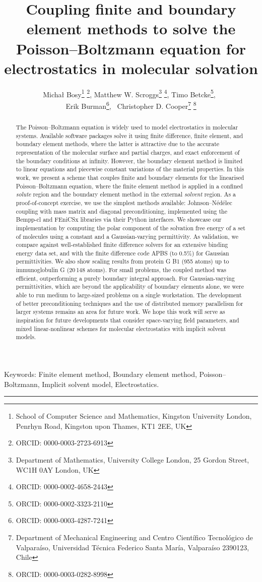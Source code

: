 \documentclass[12pt]{article}
\title{Coupling finite and boundary element methods to solve the Poisson--Boltzmann equation for electrostatics in molecular solvation}
\author{Micha\l{} Bosy\thanks{School of Computer Science and Mathematics, Kingston University London, Penrhyn Road, Kingston upon Thames, KT1 2EE, UK} \thanks{ORCID: 0000-0003-2723-6913}, 
    Matthew W. Scroggs\thanks{Department of Mathematics, University College London, 25 Gordon Street, WC1H 0AY London, UK} \thanks{ORCID: 0000-0002-4658-2443}, 
    Timo Betcke\footnotemark[2] \thanks{ORCID: 0000-0002-3323-2110},~\\%
    Erik Burman\footnotemark[2] \thanks{ORCID: 0000-0003-4287-7241},~%
    Christopher D. Cooper\thanks{Department of Mechanical Engineering and Centro Cient\'ifico Tecnol\'ogico de Valpara\'iso, Universidad T\'ecnica Federico Santa Mar\'ia, Valpara\'iso 2390123, Chile} \thanks{ORCID: 0000-0003-0282-8998}}
\newenvironment{wileykeywords}{\textsf{Keywords:}\hspace{\stretch{1}}}{\hspace{\stretch{1}}\rule{1ex}{1ex}}
\begin{document}
\maketitle


\begin{abstract}
The Poisson--Boltzmann equation is widely used to model electrostatics in molecular systems. Available software packages solve it using finite difference, finite element, and boundary element methods, where the latter is attractive due to the accurate representation of the molecular surface and partial charges, and exact enforcement of the boundary conditions at infinity. However, the boundary element method is limited to linear equations and piecewise constant variations of the material properties. In this work, we present a scheme that couples finite and boundary elements for the linearised Poisson--Boltzmann equation, where the finite element method is applied in a confined {\it solute} region and the boundary element method in the external {\it solvent} region. As a proof-of-concept exercise, we use the simplest methods available: Johnson--N\'ed\'elec coupling with mass matrix and diagonal preconditioning, implemented using the Bempp-cl and FEniCSx libraries via their Python interfaces. We showcase our implementation by computing the polar component of the solvation free energy of a set of molecules using a constant and a Gaussian-varying permittivity. As validation, we compare against well-established finite difference solvers for an extensive binding energy data set, and with the finite difference code APBS (to 0.5\%) for Gaussian permittivities. We also show scaling results from protein G B1 (955 atoms) up to immunoglobulin G (20\,148 atoms). For small problems, the coupled method was efficient, outperforming a purely boundary integral approach. For Gaussian-varying permittivities, which are beyond the applicability of boundary elements alone, we were able to run medium to large-sized problems on a single workstation. The development of better preconditioning techniques and the use of distributed memory parallelism for larger systems remains an area for future work. We hope this work will serve as inspiration for future developments that consider space-varying field parameters, and mixed linear-nonlinear schemes for molecular electrostatics with implicit solvent models. 
\end{abstract}

\begin{wileykeywords}
Finite element method, Boundary element method, Poisson--Boltzmann, Implicit solvent model, Electrostatics.
\end{wileykeywords}
\end{document}
